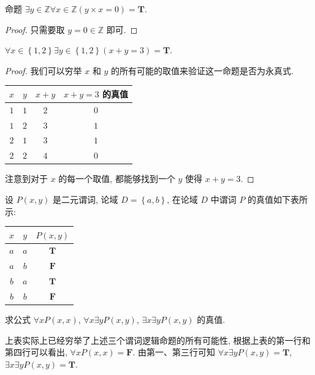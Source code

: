 \documentclass[10pt,UTF8]{book} %
\begin{document}
\begin{example}
    命题 $\exists y \in \mathbb{Z} \forall x \in \mathbb{Z} \left(
        y \times x = 0
    \right) = \mathbf{T}.$
    \begin{proof}
        只需要取 $y=0 \in \mathbb{Z}$ 即可.
    \end{proof}
\end{example}

\begin{example}
    $\forall x \in \left\{1,2\right\} \exists y \in \left\{1,2\right\}\left(
        x+y = 3
    \right) = \mathbf{T}$.
    \begin{proof}
        我们可以穷举 $x$ 和 $y$ 的所有可能的取值来验证这一命题是否为永真式.
        {\begin{longtable}{cccc}
            \toprule 
            $x$ & $y$ & $x+y$ & \textbf{$x+y = 3$ 的真值} \\
            \midrule 
            \endhead 

            \bottomrule
            \endfoot 

            $1$ & $1$ & $2$ & $0$ \\
            $1$ & $2$ & $3$ & $1$ \\
            $2$ & $1$ & $3$ & $1$ \\
            $2$ & $2$ & $4$ & $0$ \\
        \end{longtable}}
        {\noindent 注意到对于 $x$ 的每一个取值, 都能够找到一个 $y$ 使得 $x+y = 3$.}
    \end{proof}
\end{example}

\begin{example}
    设 $P(x, y)$ 是二元谓词, 论域 $D = \left\{ a,b \right\}$,
    在论域 $D$ 中谓词 $P$ 的真值如下表所示:
    {
    \begin{longtable}{ccc}
        \toprule 
        $x$ & $y$ & $P(x,y)$ \\
        \midrule 
        \endhead 

        \bottomrule
        \endfoot 

        $a$ & $a$ & $\mathbf{T}$ \\
        $a$ & $b$ & $\mathbf{F}$ \\
        $b$ & $a$ & $\mathbf{T}$ \\
        $b$ & $b$ & $\mathbf{F}$ \\
    \end{longtable}}
    {\noindent 求公式 $\forall x P(x, x)$, $\forall x \exists y P(x,y)$,
    $\exists x \exists y P(x,y)$ 的真值.}
    \begin{sol}
        上表实际上已经穷举了上述三个谓词逻辑命题的所有可能性,
        根据上表的第一行和第四行可以看出, $\forall x P(x, x) = \mathbf{F}$.
        由第一、第三行可知 $\forall x \exists y P(x,y) = \mathbf{T}$,
        $\exists x \exists y P(x,y) = \mathbf{T}$.
    \end{sol}
\end{example}
\end{document}
